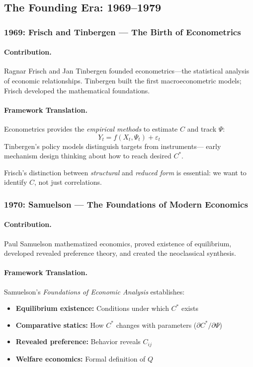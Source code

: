 \subsection{The Founding Era: 1969--1979}

\subsubsection{1969: Frisch and Tinbergen --- The Birth of Econometrics}

\paragraph{Contribution.}
Ragnar Frisch and Jan Tinbergen founded econometrics---the statistical
analysis of economic relationships. Tinbergen built the first macroeconometric
models; Frisch developed the mathematical foundations.

\paragraph{Framework Translation.}
Econometrics provides the \emph{empirical methods} to estimate $C$ and track $\Psi$:
\begin{equation}
  Y_t = f(X_t, \Psi_t) + \varepsilon_t
\end{equation}
Tinbergen's policy models distinguish targets from instruments---
early mechanism design thinking about how to reach desired $C^*$.

Frisch's distinction between \emph{structural} and \emph{reduced form}
is essential: we want to identify $C$, not just correlations.

\subsubsection{1970: Samuelson --- The Foundations of Modern Economics}

\paragraph{Contribution.}
Paul Samuelson \citep{samuelson1947} mathematized economics, proved existence of equilibrium,
developed revealed preference theory, and created the neoclassical synthesis.

\paragraph{Framework Translation.}
Samuelson's \emph{Foundations of Economic Analysis} establishes:
\begin{itemize}
  \item \textbf{Equilibrium existence:} Conditions under which $C^*$ exists
  \item \textbf{Comparative statics:} How $C^*$ changes with parameters ($\partial C^*/\partial \Psi$)
  \item \textbf{Revealed preference:} Behavior reveals $C_{ij}$
  \item \textbf{Welfare economics:} Formal definition of $Q$
\end{itemize}

